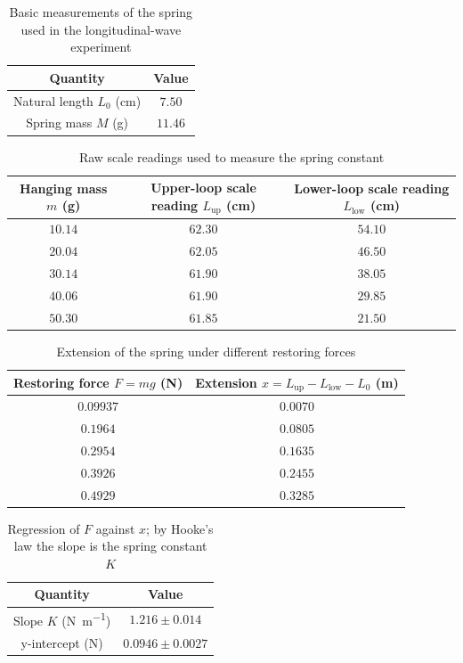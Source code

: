 \begin{table}[htb!]
\centering
\caption{Basic measurements of the spring used in the longitudinal-wave experiment}
\begin{tabular}{cc}
\toprule
Quantity & Value \\
\midrule
Natural length $L_{0}$ (\unit{\cm}) & $7.50$ \\
Spring mass $M$ (\unit{\g}) & $11.46$ \\
\bottomrule
\end{tabular}
\end{table}
\begin{table}[htb!]
\centering
\caption{Raw scale readings used to measure the spring constant}
\begin{tabular}{ccc}
\toprule
Hanging mass $m$ (\unit{\g}) & Upper-loop scale reading $L_{\text{up}}$ (\unit{\cm}) & Lower-loop scale reading $L_{\text{low}}$ (\unit{\cm}) \\
\midrule
$10.14$ & $62.30$ & $54.10$ \\
$20.04$ & $62.05$ & $46.50$ \\
$30.14$ & $61.90$ & $38.05$ \\
$40.06$ & $61.90$ & $29.85$ \\
$50.30$ & $61.85$ & $21.50$ \\
\bottomrule
\end{tabular}
\end{table}
\begin{table}[htb!]
\centering
\caption{Extension of the spring under different restoring forces}
\begin{tabular}{cc}
\toprule
Restoring force $F=mg$ (\unit{\N}) & Extension $x=L_{\text{up}}-L_{\text{low}}-L_{0}$ (\unit{\m}) \\
\midrule
$0.09937$ & $0.0070$ \\
$0.1964$ & $0.0805$ \\
$0.2954$ & $0.1635$ \\
$0.3926$ & $0.2455$ \\
$0.4929$ & $0.3285$ \\
\bottomrule
\end{tabular}
\end{table}
\begin{table}[htb!]
\centering
\caption{Regression of $F$ against $x$; by Hooke's law the slope is the spring constant $K$}
\begin{tabular}{cc}
\toprule
Quantity & Value \\
\midrule
Slope $K$ (\unit{\N\per\m}) & $1.216 \pm 0.014$ \\
y-intercept (\unit{\N}) & $0.0946 \pm 0.0027$ \\
\bottomrule
\end{tabular}
\end{table}
